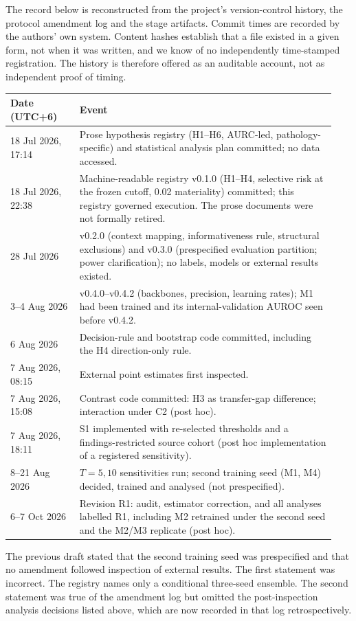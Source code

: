 The record below is reconstructed from the project's version-control history,
the protocol amendment log and the stage artifacts. Commit times are recorded
by the authors' own system. Content hashes establish that a file existed in a
given form, not when it was written, and we know of no independently
time-stamped registration. The history is therefore offered as an auditable
account, not as independent proof of timing.

\begin{center}\small
\begin{tabular}{p{0.2\linewidth}p{0.74\linewidth}}
\toprule
Date (UTC+6) & Event\\
\midrule
18 Jul 2026, 17:14 & Prose hypothesis registry (H1--H6, AURC-led, pathology-specific) and statistical analysis plan committed; no data accessed.\\
18 Jul 2026, 22:38 & Machine-readable registry v0.1.0 (H1--H4, selective risk at the frozen cutoff, 0.02 materiality) committed; this registry governed execution. The prose documents were not formally retired.\\
28 Jul 2026 & v0.2.0 (context mapping, informativeness rule, structural exclusions) and v0.3.0 (prespecified evaluation partition; power clarification); no labels, models or external results existed.\\
3--4 Aug 2026 & v0.4.0--v0.4.2 (backbones, precision, learning rates); M1 had been trained and its internal-validation AUROC seen before v0.4.2.\\
6 Aug 2026 & Decision-rule and bootstrap code committed, including the H4 direction-only rule.\\
7 Aug 2026, 08:15 & External point estimates first inspected.\\
7 Aug 2026, 15:08 & Contrast code committed: H3 as transfer-gap difference; interaction under C2 (post hoc).\\
7 Aug 2026, 18:11 & S1 implemented with re-selected thresholds and a findings-restricted source cohort (post hoc implementation of a registered sensitivity).\\
8--21 Aug 2026 & $T=5,10$ sensitivities run; second training seed (M1, M4) decided, trained and analysed (not prespecified).\\
6--7 Oct 2026 & Revision R1: audit, estimator correction, and all analyses labelled R1, including M2 retrained under the second seed and the M2/M3 replicate (post hoc).\\
\bottomrule
\end{tabular}
\end{center}

The previous draft stated that the second training seed was prespecified and
that no amendment followed inspection of external results. The first statement
was incorrect. The registry names only a conditional three-seed ensemble. The
second statement was true of the amendment log but omitted the post-inspection
analysis decisions listed above, which are now recorded in that log
retrospectively.
